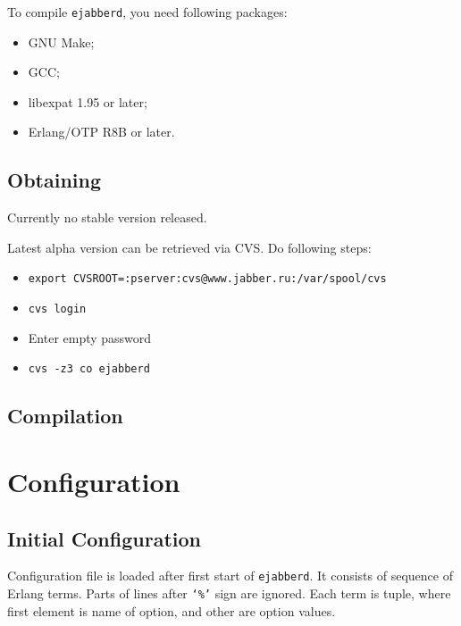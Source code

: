 \documentclass[10pt]{article}
\newcommand{\ejabberd}{\texttt{ejabberd}}
\begin{document}
To compile \ejabberd{}, you need following packages:
\begin{itemize}
\item GNU Make;
\item GCC;
\item libexpat 1.95 or later;
\item Erlang/OTP R8B or later.
\end{itemize}

\subsection{Obtaining}
\label{sec:obtaining}

Currently no stable version released.

Latest alpha version can be retrieved via CVS\@.  Do following steps:
\begin{itemize}
\item \texttt{export CVSROOT=:pserver:cvs@www.jabber.ru:/var/spool/cvs}
\item \texttt{cvs login}
\item Enter empty password
\item \texttt{cvs -z3 co ejabberd}
\end{itemize}






\subsection{Compilation}
\label{sec:compilation}






\section{Configuration}
\label{sec:configuration}

\subsection{Initial Configuration}
\label{sec:initconfig}

%

Configuration file is loaded after first start of \ejabberd{}.  It consists of
sequence of Erlang terms.  Parts of lines after \texttt{`\%'} sign are ignored.
Each term is tuple, where first element is name of option, and other are option
values.
\end{document}
